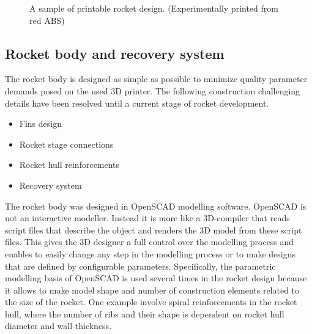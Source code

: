 \documentclass{poster16}
\begin{document}
\begin{figure}[ht]
\begin{center}
\caption{A sample of printable rocket design. (Experimentally printed from red ABS)} 
\label{fig:printed_parts}
\end{center}
\end{figure}


\subsection{Rocket body and recovery system}

The rocket body is designed as simple as possible to minimize quality parameter demands posed on the used 3D printer. The following construction challenging details have been resolved until a current stage of rocket development. 

\begin{itemize}
\item Fins design
\item Rocket stage connections
\item Rocket hull reinforcements
\item Recovery system
\end{itemize}

The rocket body was designed in OpenSCAD modelling software. OpenSCAD is not an interactive modeller. Instead it is more like a 3D-compiler that reads script files that describe the object and renders the 3D model from these script files. This gives the 3D designer a full control over the modelling process and enables to easily change any step in the modelling process or to make designs that are defined by configurable parameters.
Specifically, the parametric modelling basis of OpenSCAD is used several times in the rocket design because it allows to make model shape and number of construction elements related to the size of the rocket.  One example involve spiral reinforcements in the rocket hull, where the number of ribs and their shape is dependent on rocket hull diameter and wall thickness. 
\end{document}

